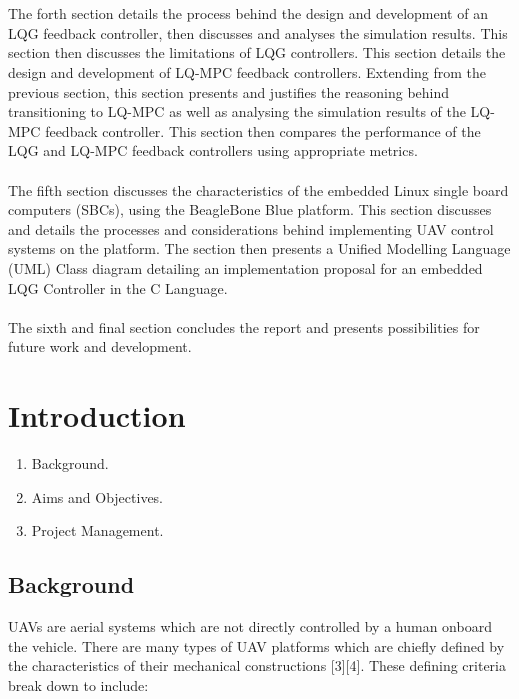 \documentclass[12pt,a4paper,twoside]{report}
\begin{document}
		\\ \\
		The forth section details the process behind the design and development of an LQG feedback controller, then discusses and analyses the simulation results. This section then discusses the limitations of LQG controllers. This section details the design and development of LQ-MPC feedback controllers. Extending from the previous section, this section presents and justifies the reasoning behind transitioning to LQ-MPC as well as analysing the simulation results of the LQ-MPC feedback controller. This section then compares the performance of the LQG and LQ-MPC feedback controllers using appropriate metrics.
		\\ \\
		The fifth section discusses the characteristics of the embedded Linux single board computers (SBCs), using the BeagleBone Blue platform. This section discusses and details the processes and considerations behind implementing UAV control systems on the platform. The section then presents a Unified Modelling Language (UML) Class diagram detailing an implementation proposal for an embedded LQG Controller in the C Language.
		\\ \\
		The sixth and final section concludes the report and presents possibilities for future work and development.
		
	\newpage
	
	\section{Introduction}
		
		\begin{enumerate}
			\item
				Background.
			\item 
				Aims and Objectives. 
			\item 
				Project Management.
		\end{enumerate}
	
	 	\newpage
	 	
		\subsection{Background}
		
			UAVs are aerial systems which are not directly controlled by a human onboard the vehicle. There are many types of UAV platforms which are chiefly defined by the characteristics of their mechanical constructions [3][4]. These defining criteria break down to include:
			
\end{document}
